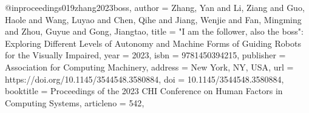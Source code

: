 @inproceedings{019zhang2023boss,
author = {Zhang, Yan and Li, Ziang and Guo, Haole and Wang, Luyao and Chen, Qihe and Jiang, Wenjie and Fan, Mingming and Zhou, Guyue and Gong, Jiangtao},
title = {"I am the follower, also the boss": Exploring Different Levels of Autonomy and Machine Forms of Guiding Robots for the Visually Impaired},
year = {2023},
isbn = {9781450394215},
publisher = {Association for Computing Machinery},
address = {New York, NY, USA},
url = {https://doi.org/10.1145/3544548.3580884},
doi = {10.1145/3544548.3580884},
booktitle = {Proceedings of the 2023 CHI Conference on Human Factors in Computing Systems},
articleno = {542},
}